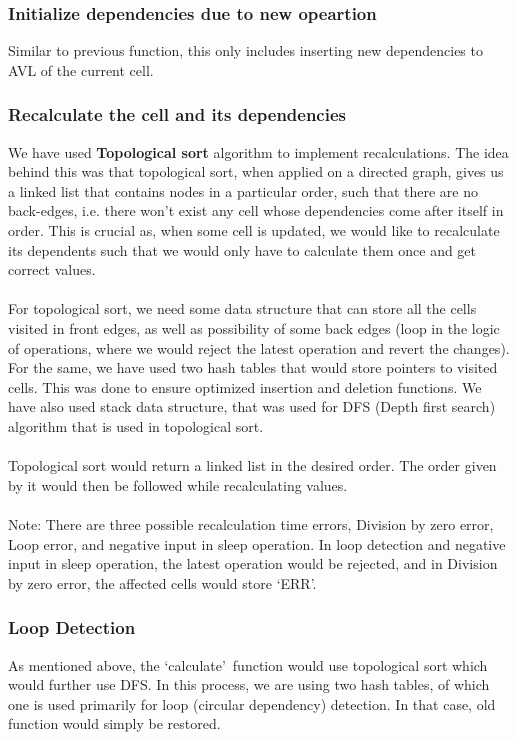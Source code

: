\documentclass{article}
\begin{document}
\subsubsection{Initialize dependencies due to new opeartion}
Similar to previous function, this only includes inserting new dependencies to AVL of the current cell.
\subsubsection{Recalculate the cell and its dependencies}
We have used \textbf{Topological sort} algorithm to implement recalculations. The idea behind this was that topological sort, when applied on a directed graph, gives us a linked list that contains nodes in a particular order, such that there are no back-edges, i.e. there won't exist any cell whose dependencies come after itself in order. This is crucial as, when some cell is updated, we would like to recalculate its dependents such that we would only have to calculate them once and get correct values. 
\\ \\
For topological sort, we need some data structure that can store all the cells visited in front edges, as well as possibility of some back edges (loop in the logic of operations, where we would reject the latest operation and revert the changes). For the same, we have used two hash tables that would store pointers to visited cells. This was done to ensure optimized insertion and deletion functions. We have also used stack data structure, that was used for DFS (Depth first search) algorithm that is used in topological sort.
\\ \\ 
Topological sort would return a linked list in the desired order. The order given by it would then be followed while recalculating values.
\\ \\ 
Note: There are three possible recalculation time errors, Division by zero error, Loop error, and negative input in sleep operation. In loop detection and negative input in sleep operation, the latest operation would be rejected, and in Division by zero error, the affected cells would store \textquoteleft ERR\textquoteright.

\subsubsection{Loop Detection}
As mentioned above, the \textquoteleft calculate\textquoteright \ function would use topological sort which would further use DFS. In this process, we are using two hash tables, of which one is used primarily for loop (circular dependency) detection. In that case, old function would simply be restored.
\end{document}
